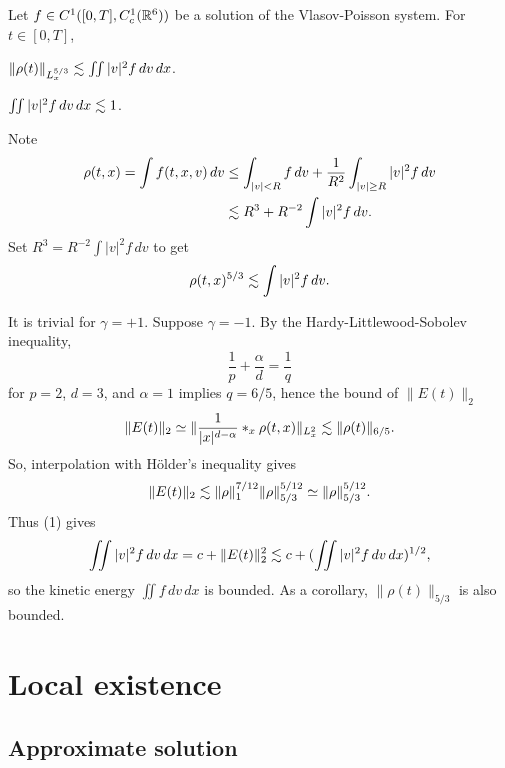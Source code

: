 \documentclass[11pt]{amsart}
\begin{document}
\begin{lem}
Let $f\in C^1([0,T],C_c^1(\mathbb{R}^6))$ be a solution of the Vlasov-Poisson system.
For $t\in[0,T]$,
\begin{cond}
\item $\|\rho(t)\|_{L_x^{5/3}}\lesssim\iint|v|^2f\,dv\,dx$.
\item $\iint|v|^2f\,dv\,dx\lesssim1$.
\end{cond}
\end{lem}
\begin{pfs}
\item
Note
\begin{align*}
\rho(t,x)=\int f(t,x,v)\,dv
&\le\int_{|v|<R}f\,dv+\frac1{R^2}\int_{|v|\ge R}|v|^2f\,dv\\
&\lesssim R^3+ R^{-2}\int|v|^2f\,dv.
\end{align*}
Set $R^3=R^{-2}\int|v|^2f\,dv$ to get
\[\rho(t,x)^{5/3}\lesssim\int|v|^2f\,dv.\]

\item
It is trivial for $\gamma=+1$.
Suppose $\gamma=-1$.
By the Hardy-Littlewood-Sobolev inequality,
\[\frac1p+\frac\alpha d=\frac1q\]
for $p=2$, $d=3$, and $\alpha=1$ implies $q=6/5$, hence the bound of $\|E(t)\|_2$
\[\|E(t)\|_2\simeq\|\frac1{|x|^{d-\alpha}}*_x\rho(t,x)\|_{L_x^2}\lesssim\|\rho(t)\|_{6/5}.\]
So, interpolation with H\"older's inequality gives
\[\|E(t)\|_2\lesssim\|\rho\|_1^{7/12}\|\rho\|_{5/3}^{5/12}\simeq\|\rho\|_{5/3}^{5/12}.\]
Thus (1) gives
\[\iint|v|^2f\,dv\,dx=c+\|E(t)\|_2^2\lesssim c+(\iint|v|^2f\,dv\,dx)^{1/2},\]
so the kinetic energy $\iint f\,dv\,dx$ is bounded.
As a corollary, $\|\rho(t)\|_{5/3}$ is also bounded.\qedhere
\end{pfs}




\section{Local existence}

\subsection{Approximate solution}
\end{document}
